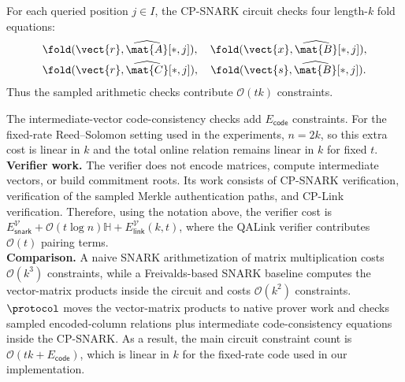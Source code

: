 For each queried position \(j\in I\), the CP-SNARK circuit checks four
length-\(k\) fold equations:
\[
\begin{aligned}
  &\fold(\vect{r},\widehat{\mat{A}}[*,j]),\quad
  \fold(\vect{x},\widehat{\mat{B}}[*,j]),\\
  &\fold(\vect{r},\widehat{\mat{C}}[*,j]),\quad
  \fold(\vect{s},\widehat{\mat{B}}[*,j]).
\end{aligned}
\]
Thus the sampled arithmetic checks contribute \(\mathcal{O}(tk)\) constraints. 

The intermediate-vector code-consistency checks add
\(E_{\mathsf{code}}\) constraints. For the fixed-rate
Reed--Solomon setting used in the experiments, \(n=2k\), so this extra cost is
linear in \(k\) and the total online relation remains linear in \(k\) for fixed
\(t\). \\

\noindent\textbf{Verifier work.}
The verifier does not encode matrices, compute intermediate vectors, or build
commitment roots.  Its work consists of CP-SNARK verification, verification of
the sampled Merkle authentication paths, and CP-Link verification.  Therefore,
using the notation above, the verifier cost is
$E_{\mathsf{snark}}^\mathcal{V} + \mathcal{O}(t\log n)\mathbb{H} +
E_{\mathsf{link}}^\mathcal{V}(k,t)$, where the QALink verifier contributes
\(\mathcal{O}(t)\) pairing terms. \\

\noindent\textbf{Comparison.}
A naive SNARK arithmetization of matrix multiplication costs
\(\mathcal{O}(k^3)\) constraints, while a Freivalds-based SNARK baseline computes
the vector-matrix products inside the circuit and costs \(\mathcal{O}(k^2)\) constraints.  
\(\protocol\) moves the vector-matrix products to native prover work and checks
sampled encoded-column relations plus intermediate code-consistency equations
inside the CP-SNARK.
As a result, the main circuit constraint count is
\(\mathcal{O}(tk+E_{\mathsf{code}})\), which is linear in \(k\) for the
fixed-rate code used in our implementation.


